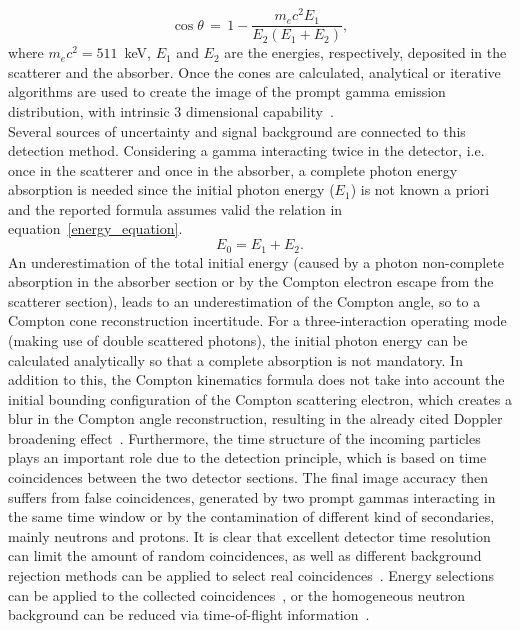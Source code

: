\begin{equation}
\cos\theta\,=\,1-\frac{m_{e}c^{2}E_{1}}{E_{2}(E_{1}+E_{2})},
\label{Compton_equation}
\end{equation} 
where \(m_{e}c^{2} = 511\)~keV, \(E_{1}\) and \(E_{2}\) are the energies, respectively, deposited in the scatterer and the absorber. 
Once the cones are calculated, analytical or iterative algorithms are used to create the image of the prompt gamma emission distribution, with intrinsic 3 dimensional capability~\cite{McKisson3D, Kuchment:2016uiw}. \\

Several sources of uncertainty and signal background are connected to this detection method. Considering a gamma interacting twice in the detector, i.e. once in the scatterer and once in the absorber, a complete photon energy absorption is needed since the initial photon energy (\(E_{1}\)) is not known a priori and the reported formula assumes valid the relation in equation~\ref{energy_equation}.
 \begin{equation}
E_{0} = E_{1}+E_{2}.
\label{energy_equation}
\end{equation} 
An underestimation of the total initial energy (caused by a photon non-complete absorption in the absorber section or by the Compton electron escape from the scatterer section), leads to an underestimation of the Compton angle, so to a Compton cone reconstruction incertitude. For a three-interaction operating mode (making use of double scattered photons), the initial photon energy can be calculated analytically so that a complete absorption is not mandatory. In addition to this, the Compton kinematics formula does not take into account the initial bounding configuration of the Compton scattering electron, which creates a blur in the Compton angle reconstruction, resulting in the already cited Doppler broadening effect~\cite{Doppler}. Furthermore, the time structure of the incoming particles plays an important role due to the detection principle, which is based on time coincidences between the two detector sections. The final image accuracy then suffers from false coincidences, generated by two prompt gammas interacting in the same time window or by the contamination of different kind of secondaries, mainly neutrons and protons. It is clear that excellent detector time resolution can limit the amount of random coincidences, as well as different background rejection methods can be applied to select real coincidences~\cite{Draeger:2017aa}. Energy selections can be applied to the collected coincidences~\cite{Polf:2009aa, Hilaire:2016aa}, or the homogeneous neutron background can be reduced via time-of-flight information~\cite{Testa:2010aa}.\\
